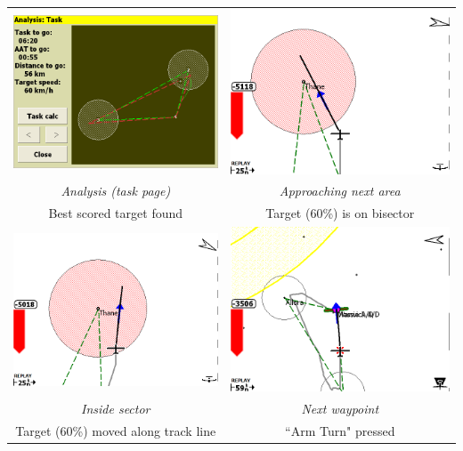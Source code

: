 \begin{maxipage}
\begin{center}
\begin{longtable}{|c|c|}
\toprule
\includegraphics[angle=0,width=0.45\linewidth,keepaspectratio='true']{figures/faat07.png} & 
\includegraphics[angle=0,width=0.45\linewidth,keepaspectratio='true']{figures/faat08.png} \\
{\em Analysis (task page)} & {\em Approaching next area} \\
Best scored target found & Target (60\%) is on bisector \\

\midrule
\includegraphics[angle=0,width=0.45\linewidth,keepaspectratio='true']{figures/faat09.png} & 
\includegraphics[angle=0,width=0.45\linewidth,keepaspectratio='true']{figures/faat11.png} \\
{\em Inside sector} & {\em Next waypoint} \\
Target (60\%) moved along track line & ``Arm Turn" pressed \\


\end{longtable}
\end{center}
\end{maxipage}

